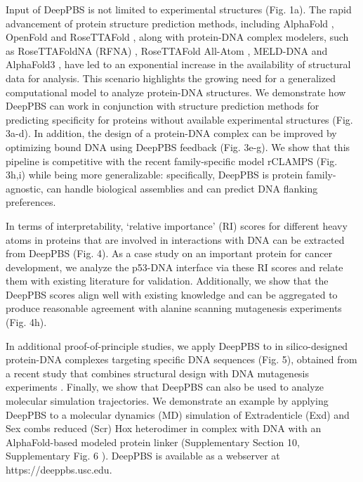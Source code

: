 \par
Input of DeepPBS is not limited to experimental structures (Fig. 1a). The rapid advancement of protein structure prediction methods, including AlphaFold \citep{Jumper2021}, OpenFold \citep{Ahdritz2024} and RoseTTAFold \citep{Baek2021}, along with protein-DNA complex modelers, such as RoseTTAFoldNA (RFNA) \citep{baek2024na}, RoseTTAFold All-Atom \citep{Krishna2024}, MELD-DNA \citep{Esmaeeli2023} and AlphaFold3 \citep{Abramson2024}, have led to an exponential increase in the availability of structural data for analysis. This scenario highlights the growing need for a generalized computational model to analyze protein-DNA structures. We demonstrate how DeepPBS can work in conjunction with structure prediction methods for predicting specificity for proteins without available experimental structures (Fig. 3a-d). In addition, the design of a protein-DNA complex can be improved by optimizing bound DNA using DeepPBS feedback (Fig. 3e-g). We show that this pipeline is competitive with the recent family-specific model rCLAMPS \citep{Wetzel2022} (Fig. 3h,i) while being more generalizable: specifically, DeepPBS is protein family-agnostic, can handle biological assemblies and can predict DNA flanking preferences.
\par
In terms of interpretability, ‘relative importance’ (RI) scores for different heavy atoms in proteins that are involved in interactions with DNA can be extracted from DeepPBS (Fig. 4). As a case study on an important protein for cancer development, we analyze the p53-DNA interface via these RI scores and relate them with existing literature for validation. Additionally, we show that the DeepPBS scores align well with existing knowledge and can be aggregated to produce reasonable agreement with alanine scanning mutagenesis experiments \citep{Morrison2001} (Fig. 4h).
\par
In additional proof-of-principle studies, we apply DeepPBS to in silico-designed protein-DNA complexes targeting specific DNA sequences (Fig. 5), obtained from a recent study that combines structural design with DNA mutagenesis experiments \citep{Glasscock2023}. Finally, we show that DeepPBS can also be used to analyze molecular simulation trajectories. We demonstrate an example by applying DeepPBS to a molecular dynamics (MD) simulation of Extradenticle (Exd) and Sex combs reduced (Scr) Hox heterodimer in complex with DNA \citep{Joshi2007} with an AlphaFold-based modeled protein linker (Supplementary Section 10, Supplementary Fig. 6 ). DeepPBS is available as a webserver at https://deeppbs.usc.edu.
\par
